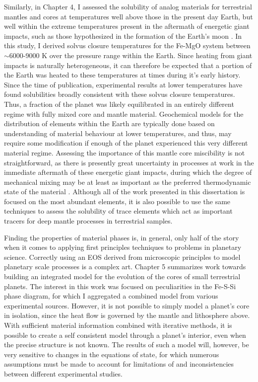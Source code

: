 Similarly, in Chapter 4, I assessed the solubility of analog materials for
terrestrial mantles and cores at temperatures well above those in the present day
Earth, but well within the extreme temperatures present in the aftermath of energetic
giant impacts, such as those hypothesized in the formation of the Earth's moon
\citep{Cuk2012,Canup2012}. In this study, I derived solvus closure temperatures for
the Fe-MgO system between $\sim$6000-9000 K over the pressure range within the Earth.
Since heating from giant impacts is naturally heterogeneous, it can therefore be
expected that a portion of the Earth was heated to these temperatures at times during
it's early history. Since the time of publication, experimental results at lower
temperatures \citep{Badro2016} have found solubilities broadly consistent with these
solvus closure temperatures. Thus, a fraction of the planet was likely equilibrated
in an entirely different regime with fully mixed core and mantle material.
Geochemical models for the distribution of elements within the Earth are typically
done based on understanding of material behaviour at lower temperatures, and thus, may
require some modification if enough of the planet experienced this very different
material regime.  Assessing the importance of this mantle core miscibility is not
straightforward, as there is presently great uncertainty in processes at work in the
immediate aftermath of these energetic giant impacts, during which the degree of
mechanical mixing may be at least as important as the preferred thermodynamic state
of the material \citep{Nakajima2014,Deguen2014}. Although all of the work presented
in this dissertation is focused on the most abundant elements, it is also possible to
use the same techniques to assess the solubility of trace elements which act as
important tracers for deep mantle processes in terrestrial samples.

Finding the properties of material phases is, in general, only half of the
story when it comes to applying first principles techniques to problems in planetary
science. Correctly using an EOS derived from microscopic principles to model
planetary scale processes is a complex art. Chapter 5 summarizes work towards
building an integrated model for the evolution of the cores of small terrestrial
planets. The interest in this work was focused on peculiarities in the Fe-S-Si phase
diagram, for which I aggregated a combined model from various experimental sources.
However, it is not possible to simply model a planet's core in isolation, since the
heat flow is governed by the mantle and lithosphere above. With sufficient material
information combined with iterative methods, it is possible to create a self
consistent model through a planet's interior, even when the precise structure is not
known. The results of such a model will, however, be very sensitive to changes in the
equations of state, for which numerous assumptions must be made to account for
limitations of and inconsistencies between different experimental studies.


